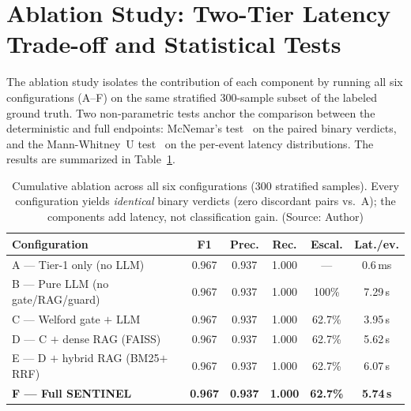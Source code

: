 \section{Ablation Study: Two-Tier Latency Trade-off and Statistical Tests}
The ablation study isolates the contribution of each component by running all six configurations (A--F) on the same stratified 300-sample subset of the labeled ground truth. Two non-parametric tests anchor the comparison between the deterministic and full endpoints: McNemar's test~\cite{mcnemar1947} on the paired binary verdicts, and the Mann-Whitney~U test~\cite{mannwhitney1947} on the per-event latency distributions. The results are summarized in Table~\ref{tab:ablation}.

\begin{table}[!htbp]
    \centering
    \footnotesize
    \setlength{\tabcolsep}{4pt}
    \caption{Cumulative ablation across all six configurations (300 stratified samples). Every configuration yields \emph{identical} binary verdicts (zero discordant pairs vs.\ A); the components add latency, not classification gain. (Source: Author)}
    \label{tab:ablation}
    \begin{tabular}{|>{\raggedright\arraybackslash}p{}|c|c|c|c|c|}
        \hline
        \textbf{Configuration} & \textbf{F1} & \textbf{Prec.} & \textbf{Rec.} & \textbf{Escal.} & \textbf{Lat./ev.} \\
        \hline
        A --- Tier-1 only (no LLM) & 0.967 & 0.937 & 1.000 & --- & 0.6\,ms \\
        \hline
        B --- Pure LLM (no gate/RAG/guard) & 0.967 & 0.937 & 1.000 & 100\% & 7.29\,s \\
        \hline
        C --- Welford gate $+$ LLM & 0.967 & 0.937 & 1.000 & 62.7\% & 3.95\,s \\
        \hline
        D --- C $+$ dense RAG (FAISS) & 0.967 & 0.937 & 1.000 & 62.7\% & 5.62\,s \\
        \hline
        E --- D $+$ hybrid RAG (BM25$+$RRF) & 0.967 & 0.937 & 1.000 & 62.7\% & 6.07\,s \\
        \hline
        \textbf{F --- Full SENTINEL} & \textbf{0.967} & \textbf{0.937} & \textbf{1.000} & \textbf{62.7\%} & \textbf{5.74\,s} \\
        \hline
    \end{tabular}
\end{table}

